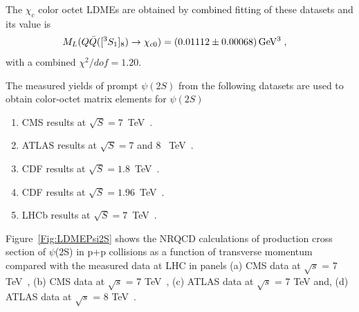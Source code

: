 \documentclass[12pt,a4paper,final]{iopart}
\newcommand{\barQ}{{\bar{Q}}}
\newcommand{\charm}{{\rm{charm}}}
\begin{document}
The $\chi_{c}$ color octet LDMEs are obtained by combined fitting of these datasets
and its value is 
\begin{equation}
  \begin{split}
    M_{L}(Q\barQ([^3S_1]_{8})\rightarrow \chi_{c0}) & 
    = (0.01112\pm {\color{black} 0.00068})\,{\rm GeV^3}\;,
    \label{eq:Mchicn1CO_val}
  \end{split}
\end{equation}
with a combined {\color{black} $\chi^2/dof=1.20$}. 

The measured yields of prompt $\psi(2S)$ from the following datasets
are used to obtain color-octet matrix elements for $\psi(2S)$ 
\begin{enumerate}
\item{CMS results at $\sqrt{S}=7$~TeV~\cite{Chatrchyan:2011kc,Khachatryan:2015rra}}.
\item{ATLAS results at $\sqrt{S}=7$ and 8 ~TeV~\cite{Aad:2015duc}}.
\item{CDF results at $\sqrt{S}=1.8$~TeV~\cite{Abe:1997jz}}.
\item{CDF results at $\sqrt{S}=1.96$~TeV~\cite{Acosta:2004yw}}.
\item{LHCb results at $\sqrt{S}=7$~TeV~\cite{Aaij:2012ag}}.
\end{enumerate}
Figure~\ref{Fig:LDMEPsi2S} shows the NRQCD calculations of production cross section of 
$\psi$(2S) in p+p collisions as a function of transverse momentum compared with the 
measured data at LHC in panels
(a) CMS data at $\sqrt{s}$ = 7 TeV~\cite{Chatrchyan:2011kc},
(b) CMS data at $\sqrt{s}$ = 7 TeV~\cite{Khachatryan:2015rra}, 
(c) ATLAS data at $\sqrt{s}$ = 7 TeV and, 
(d) ATLAS data at $\sqrt{s}$ = 8 TeV~\cite{Aad:2015duc}. 
 
\end{document}
